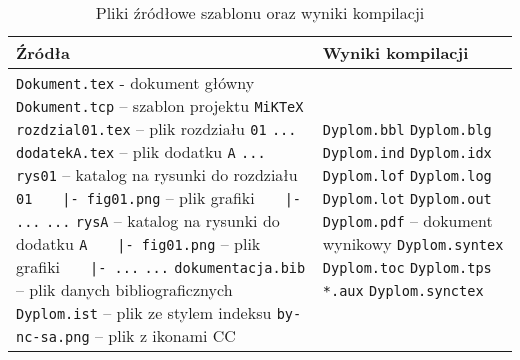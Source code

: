 \begin{table}[htb]
\centering\small
\caption{Pliki źródłowe szablonu oraz wyniki kompilacji}
\label{tab:szablon}
\begin{tabularx}{\linewidth}{|p{.55\linewidth}|X|}\hline
Źródła & Wyniki kompilacji \\ \hline\hline
\verb?Dokument.tex? - dokument główny\newline
\verb?Dokument.tcp? -- szablon projektu \texttt{MiKTeX}\newline
\verb?rozdzial01.tex? -- plik rozdziału \texttt{01}\newline
\verb?...?\newline
\verb?dodatekA.tex? -- plik dodatku \texttt{A}\newline
\verb?...?\newline
\verb?rys01? -- katalog na rysunki do rozdziału \texttt{01}\newline
\verb?   |- fig01.png? -- plik grafiki\newline
\verb?   |- ...?\newline
\verb?...?\newline
\verb?rysA? -- katalog na rysunki do dodatku \texttt{A}\newline
\verb?   |- fig01.png? -- plik grafiki\newline
\verb?   |- ...?\newline
\verb?...?\newline
\verb?dokumentacja.bib? -- plik danych bibliograficznych\newline
\verb?Dyplom.ist? -- plik ze stylem indeksu\newline
\verb?by-nc-sa.png? -- plik z ikonami CC\newline
 &
\verb?Dyplom.bbl?\newline
\verb?Dyplom.blg?\newline
\verb?Dyplom.ind?\newline
\verb?Dyplom.idx?\newline
\verb?Dyplom.lof?\newline
\verb?Dyplom.log?\newline
\verb?Dyplom.lot?\newline
\verb?Dyplom.out?\newline
\verb?Dyplom.pdf? -- dokument wynikowy\newline
\verb?Dyplom.syntex?\newline
\verb?Dyplom.toc?\newline
\verb?Dyplom.tps?\newline
\verb?*.aux?\newline 
\verb?Dyplom.synctex?\newline\\
\hline
\end{tabularx}
\end{table}

